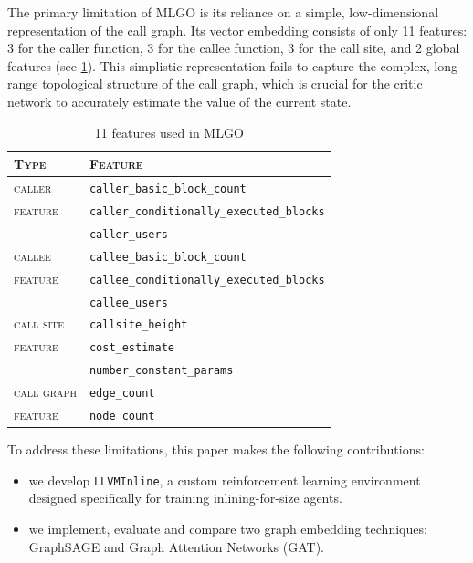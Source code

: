 \documentclass{article}
\theoremstyle{plain}
\theoremstyle{definition}
\theoremstyle{remark}
\begin{document}
The primary limitation of MLGO is its reliance on a simple, low-dimensional representation of the call graph. Its vector embedding consists of only 11 features: 3 for the caller function, 3 for the callee function, 3 for the call site, and 2 global features (see \cref{tab:inlining-features}). This simplistic representation fails to capture the complex, long-range topological structure of the call graph, which is crucial for the critic network to accurately estimate the value of the current state.


\begin{table}[t]

\vskip 0.15in
\begin{center}
\begin{scriptsize}
\begin{tabular}{ll}
\toprule
\textsc{Type} & \textsc{Feature} \\
\midrule
\textsc{caller}    & \texttt{caller\_basic\_block\_count} \\
\textsc{feature}   & \texttt{caller\_conditionally\_executed\_blocks} \\
                   & \texttt{caller\_users} \\
\midrule
\textsc{callee}    & \texttt{callee\_basic\_block\_count} \\
\textsc{feature}   & \texttt{callee\_conditionally\_executed\_blocks} \\
                   & \texttt{callee\_users} \\
\midrule
\textsc{call site} & \texttt{callsite\_height} \\
\textsc{feature}   & \texttt{cost\_estimate} \\
                   & \texttt{number\_constant\_params} \\
\midrule
\textsc{call graph}& \texttt{edge\_count} \\
\textsc{feature}   & \texttt{node\_count} \\
\bottomrule
\end{tabular}
\end{scriptsize}
\end{center}
\vskip -0.1in

\caption{11 features used in MLGO}
\label{tab:inlining-features}
\end{table}

To address these limitations, this paper makes the following contributions:
\begin{itemize}
\item we develop \verb|LLVMInline|, a custom reinforcement learning environment designed specifically for training inlining-for-size agents.
\item we implement, evaluate and compare two graph embedding techniques: GraphSAGE and Graph Attention Networks (GAT).
\end{itemize}
\end{document}

